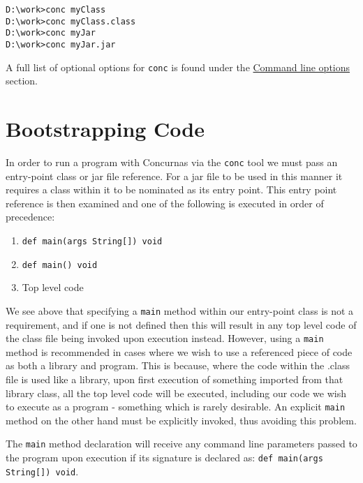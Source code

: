 \documentclass[conc-doc]{subfiles}
\begin{document}
\begin{lstlisting}[language=None]
D:\work>conc myClass
D:\work>conc myClass.class
D:\work>conc myJar
D:\work>conc myJar.jar
\end{lstlisting}


A full list of optional options for \lstinline[language=None]{conc} is found under the \hyperref[sec:cmdlineparams]{Command line options} section.

\section{Bootstrapping Code}
In order to run a program with Concurnas via the \lstinline[language=None]{conc} tool we must pass an entry-point class or jar file reference. For a jar file to be used in this manner it requires a class within it to be nominated as its entry point. This entry point reference is then examined and one of the following is executed in order of precedence:

\begin{enumerate}
	\item \lstinline!def main(args String[]) void!
	\item \lstinline!def main() void!
	\item Top level code
\end{enumerate}

We see above that specifying a \lstinline{main} method within our entry-point class is not a requirement, and if one is not defined then this will result in any top level code of the class file being invoked upon execution instead. However, using a \lstinline{main} method is recommended in cases where we wish to use a referenced piece of code as both a library and program. This is because, where the code within the .class file is used like a library, upon first execution of something imported from that library class, all the top level code will be executed, including our code we wish to execute as a program - something which is rarely desirable. An explicit \lstinline{main} method on the other hand must be explicitly invoked, thus avoiding this problem.

The \lstinline{main} method declaration will receive any command line parameters passed to the program upon execution if its signature is declared as: \lstinline{def main(args String[]) void}.
\end{document}
